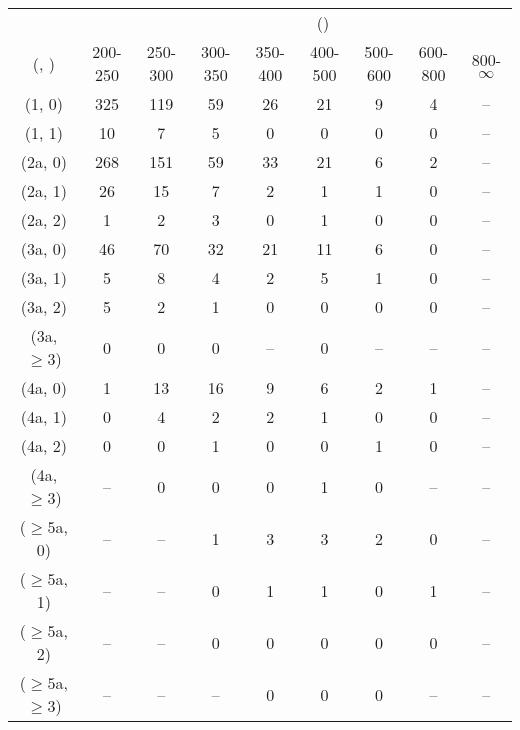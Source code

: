 \begin{table}[h!]
\tiny
\centering
{}
\begin{tabular}
{ccccccccc}
	\hline\hline
&	& \multicolumn{8}{c}{\scalht (\gev)} \\ 
	 (\njet,  \nb) & 200-250 & 250-300 & 300-350 & 350-400 & 400-500 & 500-600 & 600-800 & 800-$\infty$ \\ [0.8ex] 
\hline
	(1, 0) & 325 & 119 & 59 & 26 & 21 & 9 & 4 & -- \\[0.5ex] 
	(1, 1) & 10 & 7 & 5 & 0 & 0 & 0 & 0 & -- \\[0.5ex] 
	(2a, 0) & 268 & 151 & 59 & 33 & 21 & 6 & 2 & -- \\[0.5ex] 
	(2a, 1) & 26 & 15 & 7 & 2 & 1 & 1 & 0 & -- \\[0.5ex] 
	(2a, 2) & 1 & 2 & 3 & 0 & 1 & 0 & 0 & -- \\[0.5ex] 
	(3a, 0) & 46 & 70 & 32 & 21 & 11 & 6 & 0 & -- \\[0.5ex] 
	(3a, 1) & 5 & 8 & 4 & 2 & 5 & 1 & 0 & -- \\[0.5ex] 
	(3a, 2) & 5 & 2 & 1 & 0 & 0 & 0 & 0 & -- \\[0.5ex] 
	(3a, $\ge3$) & 0 & 0 & 0 & -- & 0 & -- & -- & -- \\[0.5ex] 
	(4a, 0) & 1 & 13 & 16 & 9 & 6 & 2 & 1 & -- \\[0.5ex] 
	(4a, 1) & 0 & 4 & 2 & 2 & 1 & 0 & 0 & -- \\[0.5ex] 
	(4a, 2) & 0 & 0 & 1 & 0 & 0 & 1 & 0 & -- \\[0.5ex] 
	(4a, $\ge3$) & -- & 0 & 0 & 0 & 1 & 0 & -- & -- \\[0.5ex] 
	($\ge5$a, 0) & -- & -- & 1 & 3 & 3 & 2 & 0 & -- \\[0.5ex] 
	($\ge5$a, 1) & -- & -- & 0 & 1 & 1 & 0 & 1 & -- \\[0.5ex] 
	($\ge5$a, 2) & -- & -- & 0 & 0 & 0 & 0 & 0 & -- \\[0.5ex] 
	($\ge5$a, $\ge3$) & -- & -- & -- & 0 & 0 & 0 & -- & -- \\[0.5ex] 
	\hline
	\hline
\end{tabular}
\end{table}
